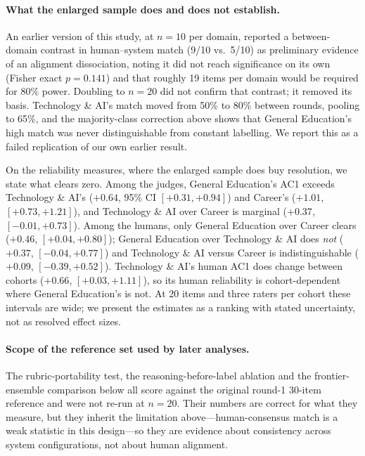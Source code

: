 \documentclass[letterpaper]{article}
\begin{document}
\paragraph{What the enlarged sample does and does not establish.}
An earlier version of this study, at $n=10$ per domain, reported a
between-domain contrast in human--system match (9/10 vs.\ 5/10) as preliminary
evidence of an alignment dissociation, noting it did not reach significance on
its own (Fisher exact $p = 0.141$) and that roughly 19 items per domain would
be required for 80\% power. Doubling to $n=20$ did not confirm that contrast;
it removed its basis. Technology \& AI's match moved from 50\% to 80\% between
rounds, pooling to 65\%, and the majority-class correction above shows that
General Education's high match was never distinguishable from constant
labelling. We report this as a failed replication of our own earlier result.

On the reliability measures, where the enlarged sample does buy resolution, we
state what clears zero. Among the judges, General Education's AC1 exceeds
Technology \& AI's ($+0.64$, 95\% CI $[+0.31, +0.94]$) and Career's ($+1.01$,
$[+0.73, +1.21]$), and Technology \& AI over Career is marginal ($+0.37$, $[-0.01, +0.73]$). Among the humans, only General Education over Career clears
($+0.46$, $[+0.04, +0.80]$); General Education over Technology \& AI does
\emph{not} ($+0.37$, $[-0.04, +0.77]$) and Technology \& AI versus Career is
indistinguishable ($+0.09$, $[-0.39, +0.52]$). Technology \& AI's human AC1
does change between cohorts ($+0.66$, $[+0.03, +1.11]$), so its human
reliability is cohort-dependent where General Education's is not. At 20 items
and three raters per cohort these intervals are wide; we present the estimates
as a ranking with stated uncertainty, not as resolved effect sizes.

\paragraph{Scope of the reference set used by later analyses.}
The rubric-portability test, the reasoning-before-label ablation and the
frontier-ensemble comparison below all score against the original round-1
30-item reference and were not re-run at $n=20$. Their numbers are correct for
what they measure, but they inherit the limitation above---human-consensus
match is a weak statistic in this design---so they are evidence about
consistency across system configurations, not about human alignment.
\end{document}

